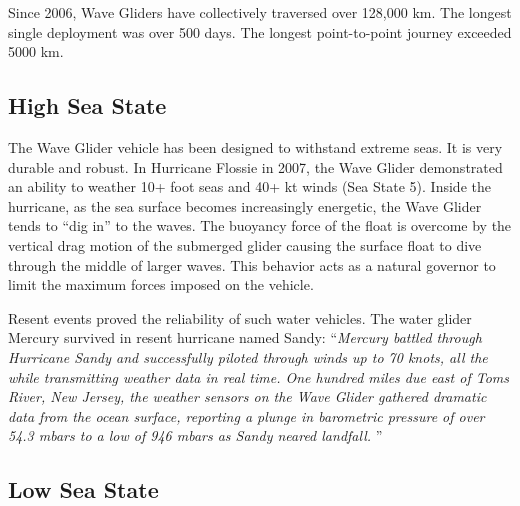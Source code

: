 Since 2006, Wave Gliders have collectively traversed over 128,000 km. The longest single deployment was over 500 days. The longest point-to-point journey exceeded 5000 km. \cite{5669607}



\subsection{High Sea State}



The Wave Glider vehicle has been designed to withstand extreme seas. It is very durable and robust. In Hurricane Flossie in 2007, the Wave Glider demonstrated an ability to weather 10+ foot seas and 40+ kt winds (Sea State 5)\cite{5422129}. Inside the hurricane, as the sea surface becomes increasingly energetic, the Wave Glider tends to “dig in” to the waves. The buoyancy force of the float is overcome by the vertical drag motion of the submerged glider causing the surface float to dive through the middle of larger waves. This behavior acts as a natural governor to limit the maximum forces imposed on the vehicle. 


Resent events proved the reliability of such water vehicles. The water glider Mercury  survived in resent hurricane named Sandy: ``\emph{Mercury battled through Hurricane Sandy and successfully piloted through winds up to 70 knots, all the while transmitting weather data in real time. One hundred miles due east of Toms River, New Jersey, the weather sensors on the Wave Glider gathered dramatic data from the ocean surface, reporting a plunge in barometric pressure of over 54.3 mbars to a low of 946 mbars as Sandy neared landfall. }''\cite{news:hurricane_sandy}

\subsection{Low Sea State}


